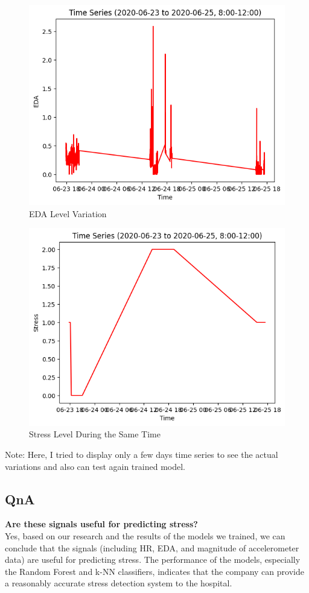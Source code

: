 \documentclass{article}
\begin{document}
\begin{figure}
    \centering
    \includegraphics{EDA.png}
    \caption{EDA Level Variation}
    \label{fig:my_label}
\end{figure}

\begin{figure}
    \centering
    \includegraphics{StressLevel.png}
    \caption{Stress Level During the Same Time}
    \label{fig:my_label}
\end{figure}
Note: Here, I tried to display only a few days time series to see the actual variations and also can test again trained model.

\subsection{QnA}
\textbf{Are these signals useful for predicting stress?}
\\ Yes, based on our research and the results of the models we trained, we can conclude that the signals (including HR, EDA, and magnitude of accelerometer data) are useful for predicting stress. The performance of the models, especially the Random Forest and k-NN classifiers, indicates that the company can provide a reasonably accurate stress detection system to the hospital.
\end{document}
